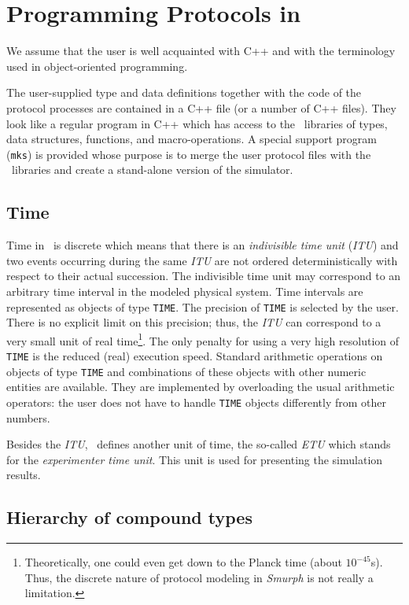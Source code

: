 \section{Programming Protocols in \smurph}

We assume that the user is well acquainted with C++ and with the terminology
used in object-oriented programming.

The user-supplied type and data definitions together with the code of the
protocol processes are contained in a C++ file (or a number of C++ files).
They look like a regular program in C++ which has access to the \smurph\
libraries of types, data structures, functions, and macro-operations.
A special support program ({\tt mks}) is provided whose purpose is to
merge the user protocol files with the \smurph\ libraries and create
a stand-alone version of the simulator.

\subsection{Time}

Time in \smurph\ is discrete which means that there is an
{\em indivisible time unit\/} ({\em ITU\/}) and two events occurring during
the same {\em ITU\/} are not ordered deterministically with respect to their
actual succession.
The indivisible time unit may correspond to an
arbitrary time interval in the modeled physical system.
Time intervals are represented as objects of type {\tt TIME}.
The precision of {\tt TIME} is selected by the user.
There is no explicit limit on this precision;
thus, the {\em ITU\/} can correspond to a very small unit of real
time\footnote{Theoretically, one could even get down to the Planck time (about
$10^{-45}$s). Thus, the discrete nature of protocol modeling in {\em Smurph\/}
 is not really a limitation.}.
The only penalty for using a very high resolution of {\tt TIME} is the
reduced (real) execution speed.
Standard arithmetic operations on objects of type {\tt TIME} and combinations
of these objects with other numeric entities are available.
They are implemented by overloading the usual arithmetic operators:
the user does not have to handle {\tt TIME} objects differently from other
numbers.

Besides the {\em ITU}, \smurph\ defines another unit of time, the so-called
{\em ETU\/} which stands for the {\em experimenter time unit}.
This unit is used for presenting the simulation results.

\subsection{Hierarchy of compound types}

